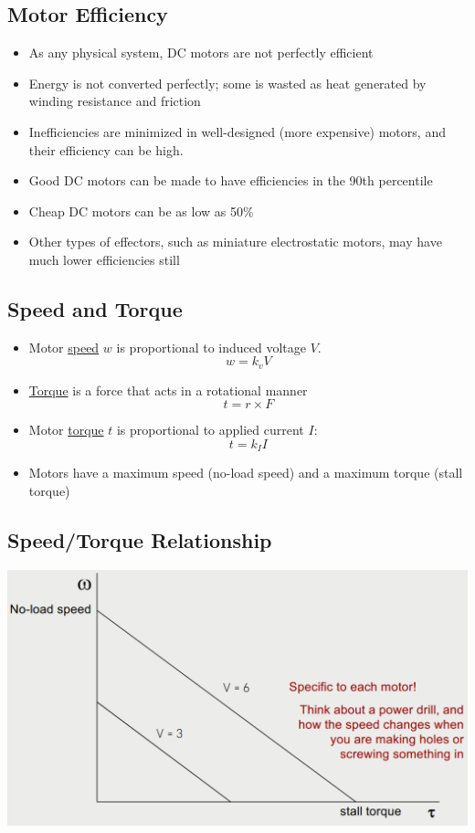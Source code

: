 \documentclass[10pt]{article}
\begin{document}
\subsection*{Motor Efficiency}
\begin{itemize}
	\item As any physical system, DC motors are not perfectly efficient
	\item Energy is not converted perfectly; some is wasted as heat generated by winding resistance and friction
	\item Inefficiencies are minimized in well-designed (more expensive) motors, and their efficiency can be high.
	\item Good DC motors can be made to have efficiencies in the 90th percentile
	\item Cheap DC motors can be as low as 50\%
	\item Other types of effectors, such as miniature electrostatic motors, may have much lower efficiencies still
\end{itemize}

\subsection*{Speed and Torque}
\begin{itemize}
	\item Motor \underline{speed} $w$ is proportional to induced voltage $V$.
	\[w = k_v V\]
    \item \underline{Torque} is a force that acts in a rotational manner
    \[t = r \times F\]
    \item Motor \underline{torque} $t$ is proportional to applied current $I$:
    \[t = k_I I\]
    \item Motors have a maximum speed (no-load speed) and a maximum torque (stall torque)
\end{itemize}

\subsection*{Speed/Torque Relationship}
\begin{center} 
	\includegraphics*[width=\textwidth]{L2_11.png} 
\end{center}
\end{document}
